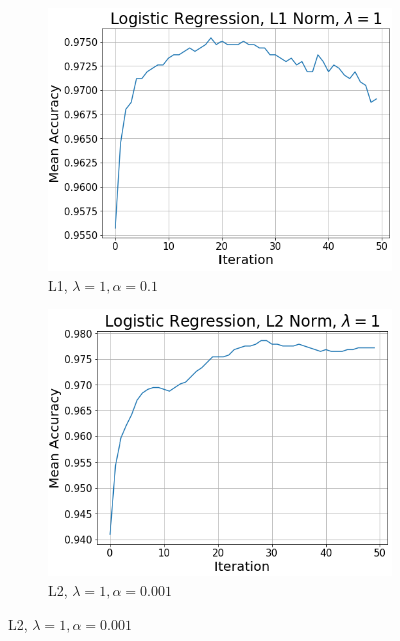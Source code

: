 \documentclass{article}
\begin{document}
\begin{enumerate}
\begin{figure}[h!]
\begin{subfigure}[b]{0.3\textwidth}
     	\end{subfigure}
     	\hfill
     	\begin{subfigure}[b]{0.3\textwidth}
         	\centering
         	\includegraphics[width=\textwidth]
         	{Problem_2_3/logistic_L1_3.png}
         	\caption{L1, $\lambda=1,\alpha=0.1$}
         	\label{fig:LR_L1_3}
     	\end{subfigure}
		\hfill
     	\begin{subfigure}[b]{0.3\textwidth}
         	\centering
         	\includegraphics[width=\textwidth]
         	{Problem_2_3/logistic_L2_1.png}
         	\caption{L2, $\lambda=1,\alpha=0.001$}
         	\label{fig:LR_L2_1}
     	\end{subfigure}

\end{figure}
\end{enumerate}
\end{document}
